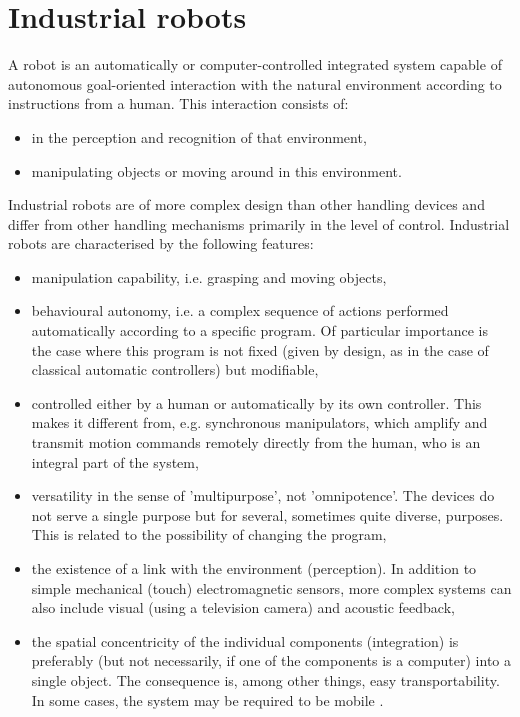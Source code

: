 \section{Industrial robots}

A robot is an automatically or computer-controlled integrated system capable of autonomous goal-oriented interaction with the natural environment according to instructions from a human. This
interaction consists of:

\begin{itemize}

    \item in the perception and recognition of that environment,
    \item manipulating objects or moving around in this environment. 

\end{itemize}

 Industrial robots are of more complex design than other handling devices and differ from other handling mechanisms primarily in the level of control.  Industrial robots are characterised by the following features:
 
\begin{itemize}
 
    \item  manipulation capability, i.e. grasping and moving objects, 
    \item behavioural autonomy, i.e. a complex sequence of actions performed automatically according to a specific program. Of particular importance is the case where this program is not fixed (given by design, as in the case of classical automatic controllers) but modifiable,
    \item controlled either by a human or automatically by its own controller.  This makes it different from, e.g. synchronous manipulators, which amplify and transmit motion commands remotely directly from the human, who is an integral part of the system,
    \item versatility in the sense of 'multipurpose', not 'omnipotence'. The devices do not serve a single purpose but for several, sometimes quite diverse, purposes. This is related to the possibility of changing the program,
    \item the existence of a link with the environment (perception). In addition to simple mechanical (touch) electromagnetic sensors, more complex systems can also include visual (using a television camera) and acoustic feedback,
    \item the spatial concentricity of the individual components (integration) is preferably (but not necessarily, if one of the components is a computer) into a single object. The consequence is, among other things, easy transportability. In some cases, the system may be required to be mobile \cite{vsb_2007}.

\end{itemize}

